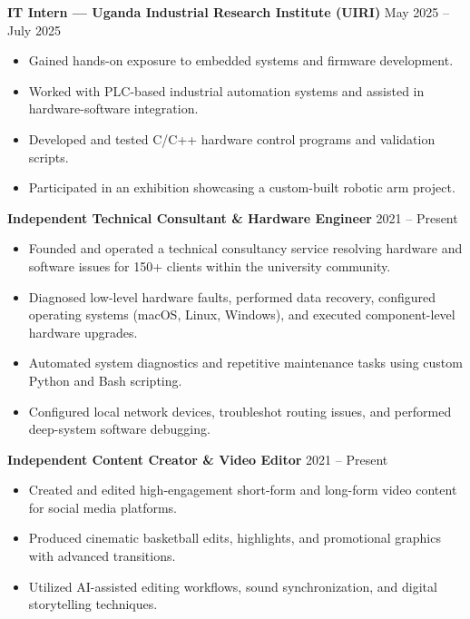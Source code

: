 \documentclass[a4paper,10pt]{article}
\begin{document}
\textbf{IT Intern — Uganda Industrial Research Institute (UIRI)} \hfill May 2025 – July 2025
\begin{itemize}[leftmargin=*]
    \item Gained hands-on exposure to embedded systems and firmware development.
    \item Worked with PLC-based industrial automation systems and assisted in hardware-software integration.
    \item Developed and tested C/C++ hardware control programs and validation scripts.
    \item Participated in an exhibition showcasing a custom-built robotic arm project.
\end{itemize}

\textbf{Independent Technical Consultant \& Hardware Engineer} \hfill 2021 – Present
\begin{itemize}[leftmargin=*]
    \item Founded and operated a technical consultancy service resolving hardware and software issues for 150+ clients within the university community.
    \item Diagnosed low-level hardware faults, performed data recovery, configured operating systems (macOS, Linux, Windows), and executed component-level hardware upgrades.
    \item Automated system diagnostics and repetitive maintenance tasks using custom Python and Bash scripting.
    \item Configured local network devices, troubleshot routing issues, and performed deep-system software debugging.
\end{itemize}

\textbf{Independent Content Creator \& Video Editor} \hfill 2021 – Present
\begin{itemize}[leftmargin=*]
    \item Created and edited high-engagement short-form and long-form video content for social media platforms.
    \item Produced cinematic basketball edits, highlights, and promotional graphics with advanced transitions.
    \item Utilized AI-assisted editing workflows, sound synchronization, and digital storytelling techniques.
\end{itemize}
\end{document}
